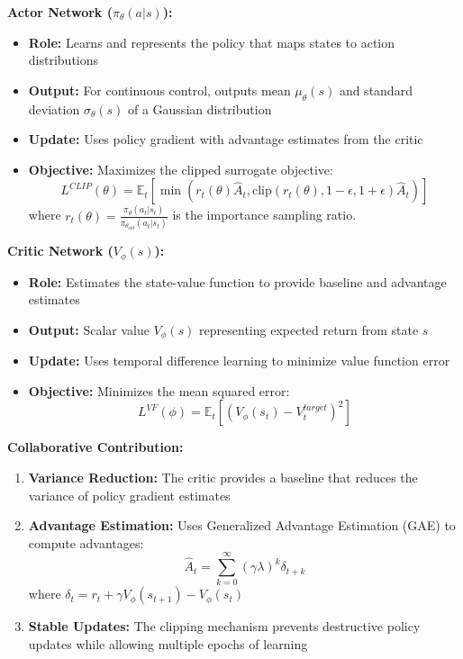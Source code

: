 \documentclass[12pt]{article}
\begin{document}
{{{\textbf{Actor Network ($\pi_\theta(a|s)$):}
\begin{itemize}
    \item \textbf{Role:} Learns and represents the policy that maps states to action distributions
    \item \textbf{Output:} For continuous control, outputs mean $\mu_\theta(s)$ and standard deviation $\sigma_\theta(s)$ of a Gaussian distribution
    \item \textbf{Update:} Uses policy gradient with advantage estimates from the critic
    \item \textbf{Objective:} Maximizes the clipped surrogate objective:
    \[
    L^{CLIP}(\theta) = \mathbb{E}_t\left[\min(r_t(\theta)\hat{A}_t, \text{clip}(r_t(\theta), 1-\epsilon, 1+\epsilon)\hat{A}_t)\right]
    \]
    where $r_t(\theta) = \frac{\pi_\theta(a_t|s_t)}{\pi_{\theta_{old}}(a_t|s_t)}$ is the importance sampling ratio.
\end{itemize}

\textbf{Critic Network ($V_\phi(s)$):}
\begin{itemize}
    \item \textbf{Role:} Estimates the state-value function to provide baseline and advantage estimates
    \item \textbf{Output:} Scalar value $V_\phi(s)$ representing expected return from state $s$
    \item \textbf{Update:} Uses temporal difference learning to minimize value function error
    \item \textbf{Objective:} Minimizes the mean squared error:
    \[
    L^{VF}(\phi) = \mathbb{E}_t\left[(V_\phi(s_t) - V_t^{target})^2\right]
    \]
\end{itemize}

\textbf{Collaborative Contribution:}
\begin{enumerate}
    \item \textbf{Variance Reduction:} The critic provides a baseline that reduces the variance of policy gradient estimates
    \item \textbf{Advantage Estimation:} Uses Generalized Advantage Estimation (GAE) to compute advantages:
    \[
    \hat{A}_t = \sum_{k=0}^{\infty} (\gamma\lambda)^k \delta_{t+k}
    \]
    where $\delta_t = r_t + \gamma V_\phi(s_{t+1}) - V_\phi(s_t)$
    \item \textbf{Stable Updates:} The clipping mechanism prevents destructive policy updates while allowing multiple epochs of learning
\end{enumerate}

}}}
\end{document}
